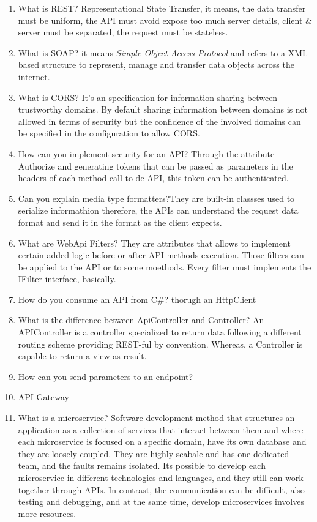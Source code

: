 \begin{multicols}{2}
\begin{enumerate}
\item What is REST? Representational State Transfer, it means, the data transfer must be uniform, the API must avoid expose too much server details, client \& server must be separated, the request must be stateless.

\item What is SOAP? it means \emph{Simple Object Access Protocol} and refers to a XML based structure to represent, manage and transfer data objects across the internet.

\item What is CORS? It's an specification for information sharing between trustworthy domains. By default sharing information between domains is not allowed in terms of security but the confidence of the involved domains can be specified in the configuration to allow CORS.

\item How can you implement security for an API? Through the attribute Authorize and generating tokens that can be passed as parameters in the headers of each method call to de API, this token can be authenticated.

\item Can you explain media type formatters?They are built-in classses used to serialize informathion therefore, the APIs can understand the request data format and send it in the format as the client expects.

\item What are WebApi Filters? They are attributes that allows to implement certain added logic before or after API methods execution. Those filters can be applied to the API or to some moethods. Every filter must implements the IFilter interface, basically.

\item How do you consume an API from C\#? thorugh an HttpClient

\item What is the difference between ApiController and Controller? An APIController is a controller specialized to return data following a different routing scheme providing REST-ful by convention. Whereas, a Controller is capable to return a view as result.

\item How can you send parameters to an endpoint?

\item API Gateway

\item What is a microservice? Software development method that structures an application as a collection of services that interact between them and where each microservice is focused on a specific domain, have its own database and they are loosely coupled. They are highly scabale and has one dedicated team, and the faults remains isolated. Its possible to develop each microservice in different technologies and languages, and they still can work together through APIs. In contrast, the communication can be difficult, also testing and debugging, and at the same time, develop microservices involves more resources.


\end{enumerate}
\end{multicols}
